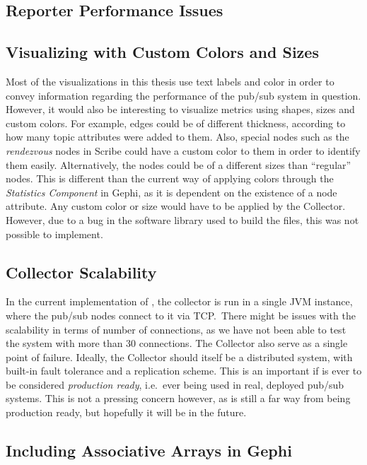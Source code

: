 \subsection{Reporter Performance Issues}

\subsection{Visualizing with Custom Colors and Sizes}

Most of the visualizations in this thesis use text labels and color in
order to convey information regarding the performance of the pub/sub
system in question. However, it would also be interesting to visualize
metrics using shapes, sizes and custom colors. For example, edges could
be of different thickness, according to how many topic attributes were
added to them. Also, special nodes such as the \emph{rendezvous} nodes
in Scribe could have a custom color to them in order to identify them
easily. Alternatively, the nodes could be of a different sizes than
``regular'' nodes. This is different than the current way of applying
colors through the \emph{Statistics Component} in Gephi, as it is
dependent on the existence of a node attribute. Any custom color or size
would have to be applied by the Collector. However, due to a bug in the
software library used to build the \gexf{} files, this was not possible
to implement.


\subsection{Collector Scalability}

In the current implementation of \demo{}, the collector is run in a
single JVM instance, where the pub/sub nodes connect to it via TCP.\
There might be issues with the scalability in terms of number of
connections, as we have not been able to test the system with more than
30 connections. The Collector also serve as a single point of failure.
Ideally, the Collector should itself be a distributed system, with
built-in fault tolerance and a replication scheme. This is an important
if \demo{} is ever to be considered \emph{production ready}, i.e.\ ever
being used in real, deployed pub/sub systems. This is not a pressing
concern however, as \demo{} is still a far way from being production
ready, but hopefully it will be in the future.

\subsection{Including Associative Arrays in Gephi}

